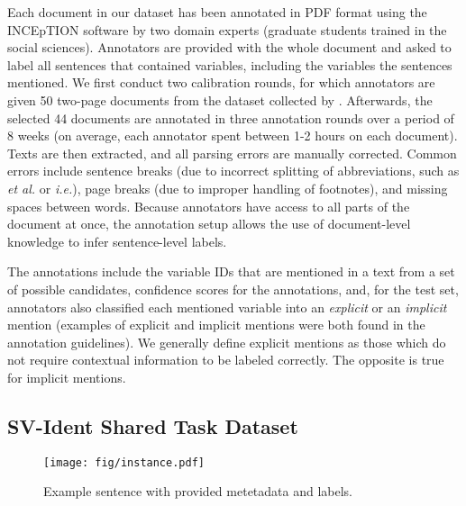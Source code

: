 \documentclass[11pt]{article}
\begin{document}
Each document in our dataset has been annotated in PDF format using the INCEpTION software \citep{klie-etal-2018-inception} by two domain experts (graduate students trained in the social sciences).
Annotators are provided with the whole document and asked to label all sentences that contained variables, including the variables the sentences mentioned.
We first conduct two calibration rounds, for which annotators are given 50 two-page documents from the dataset collected by \citet{zielinski-mutschke-2018-towards}.
Afterwards, the selected 44 documents are annotated in three annotation rounds over a period of 8 weeks (on average, each annotator spent between 1-2 hours on each document).
Texts are then extracted, and all parsing errors are manually corrected.
Common errors include sentence breaks (due to incorrect splitting of abbreviations, such as \textit{et al.} or \textit{i.e.}), page breaks (due to improper handling of footnotes), and missing spaces between words.
Because annotators have access to all parts of the document at once, the annotation setup allows the use of document-level knowledge to infer sentence-level labels.

The annotations include the variable IDs that are mentioned in a text from a set of possible candidates, confidence scores for the annotations, and, for the test set, annotators also classified each mentioned variable into an \textit{explicit} or an \textit{implicit} mention (examples of explicit and implicit mentions were both found in the annotation guidelines).
We generally define explicit mentions as those which do not require contextual information to be labeled correctly.
The opposite is true for implicit mentions.

\subsection{SV-Ident Shared Task Dataset}
\begin{figure}
    \centering
    \texttt{[image: fig/instance.pdf]}
    \caption{Example sentence with provided metetadata and labels.}
    \label{fig:instance}
\end{figure}
\end{document}
